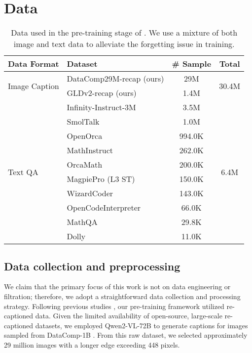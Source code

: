 \section{Data}
\label{sec:data}
\begin{table}[t]
    \centering
    \renewcommand{\arraystretch}{1.2} %
    \setlength{\tabcolsep}{2pt} %
    \small
    \begin{tabular}{l|l|c|c}
        \toprule
         Data Format & Dataset & \# Sample & Total \\
         \midrule
        \multirow{2}{*}{Image Caption} & DataComp29M-recap (ours) & 29M & \multirow{2}{*}{30.4M} \\
         & GLDv2-recap (ours) & 1.4M & \\
        \midrule
        \multirow{10}{*}{Text QA} & Infinity-Instruct-3M \cite{infinityinstruct} & 3.5M & \multirow{10}{*}{6.4M} \\
         & SmolTalk \cite{smoltalk} & 1.0M & \\
         & OpenOrca \cite{OpenOrca} & 994.0K & \\
         & MathInstruct \cite{mathinstruct} & 262.0K & \\
         & OrcaMath \cite{orcamath} & 200.0K & \\
         & MagpiePro (L3 ST) \cite{llavaov} & 150.0K & \\
         & WizardCoder \cite{wizardcoder} & 143.0K & \\
         & OpenCodeInterpreter \cite{opencodeinterpreter} & 66.0K & \\
         & MathQA \cite{mathqa} & 29.8K & \\
         & Dolly \cite{dolly} & 11.0K & \\
        \bottomrule
    \end{tabular}
    \caption{Data used in the pre-training stage of \model{}. We use a mixture of both image and text data to alleviate the forgetting issue in training.}
    \label{tab:data}
\end{table}

\subsection{Data collection and preprocessing}
We claim that the primary focus of this work is not on data engineering or filtration; therefore, we adopt a straightforward data collection and processing strategy. Following previous studies \cite{eve, evev2, monointernvl}, our pre-training framework utilized re-captioned data. Given the limited availability of open-source, large-scale re-captioned datasets, we employed Qwen2-VL-72B \cite{qwen2vl} to generate captions for images sampled from DataComp-1B \cite{datacomp}. From this raw dataset, we selected approximately 29 million images with a longer edge exceeding 448 pixels.

